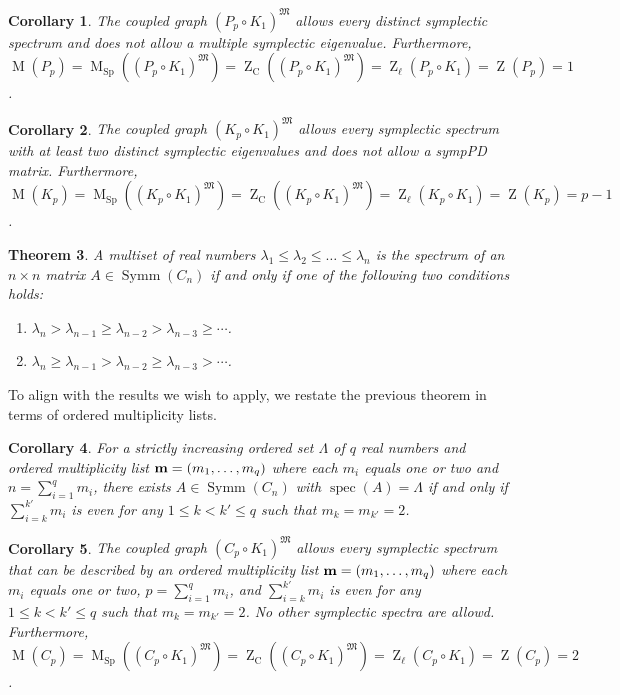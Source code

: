 \documentclass[12pt]{article}
\newtheorem{thm}{Theorem}[section]
\newtheorem{cor}[thm]{Corollary}
\theoremstyle{definition}
\theoremstyle{definition}
\theoremstyle{definition}
\numberwithin{figure}{section}
\numberwithin{equation}{section}
\newcommand{\MM}{\mathfrak{M}}
\newcommand{\symm}{\operatorname{Symm}}
\newcommand{\oml}{{\bf m}}
\newcommand{\Z}{\operatorname{Z}}
\newcommand{\ZC}{\Z_{\operatorname{C}}}
\newcommand{\Zell}{\Z_{\ell}}
\newcommand{\M}{\operatorname{M}}
\newcommand{\MC}{\M_{\operatorname{Sp}}}
\newcommand{\spec}{\operatorname{spec}}
\newcommand{\x}{\times}
\newcommand{\ben}{\begin{enumerate}}
\newcommand{\een}{\end{enumerate}}
\begin{document}
\begin{cor}\label{PpcircK1}
     The coupled graph $(P_p\circ K_1)^{\MM}$ allows  every distinct symplectic spectrum and does not allow a multiple symplectic eigenvalue.  Furthermore, $\M(P_p)=\MC((P_p\circ K_1)^{\MM})=\ZC((P_p\circ K_1)^{\MM})=\Zell(P_p\circ K_1)=\Z(P_p)=1$.
\end{cor}


\begin{cor}\label{KpcircK1}
     The coupled graph $(K_p\circ K_1)^{\MM}$ allows  every symplectic spectrum with at least two distinct symplectic eigenvalues and does not allow a sympPD matrix.  Furthermore, $\M(K_p)=\MC((K_p\circ K_1)^{\MM})=\ZC((K_p\circ K_1)^{\MM})=\Zell(K_p\circ K_1)=\Z(K_p)=p-1$.
\end{cor}


\begin{thm}{\rm \cite{Ferg80, FF09}} A multiset of real numbers $\lambda_1\le \lambda_2\le \dots\le \lambda_n$ is the spectrum of an $n\x n$  matrix  $A\in\symm(C_n)$  
if and only if
one of the following two conditions holds:
\ben[$(a)$]
\item  $\lambda_{n}>\lambda_{n-1}\ge \lambda_{n-2} > \lambda_{n-3} \ge\cdots $. 
\item $\lambda_{n}\ge \lambda_{n-1}> \lambda_{n-2} \ge \lambda_{n-3} >\cdots $.
\een
\end{thm}

To align with the results we wish to apply, we restate the previous theorem in terms of ordered multiplicity lists.



\begin{cor}  For a strictly increasing ordered set $\Lambda$ of $q$ real numbers  and 
 ordered multiplicity list $\oml=(m_1,\dots,m_q)$ where each $m_i$ equals one or two
 and  $n=\sum_{i=1}^q m_i$,  there exists $A\in\symm(C_n)$ with $\spec(A)=\Lambda$ if and only if $\sum_{i=k}^{k'}m_i$ is even
 for any $1\leq k< k'\leq q$ such that $m_k=m_{k'}=2$.
 
\end{cor}

\begin{cor}\label{CpcircK1}
The coupled graph $(C_p\circ K_1)^{\MM}$ allows  every symplectic spectrum that can be described by an 
 ordered multiplicity list $\oml=(m_1,\dots,m_q)$  where each $m_i$ equals one or two,
 $p=\sum_{i=1}^q m_i$, and
   $\sum_{i=k}^{k'}m_i$ is even for any $1\leq k< k'\leq q$ such that $m_k=m_{k'}=2$. No other symplectic spectra are allowd.
 Furthermore, $\M(C_p)=\MC((C_p\circ K_1)^{\MM})=\ZC((C_p\circ K_1)^{\MM})=\Zell(C_p\circ K_1)=\Z(C_p)=2$.
 \end{cor} 
\end{document}
